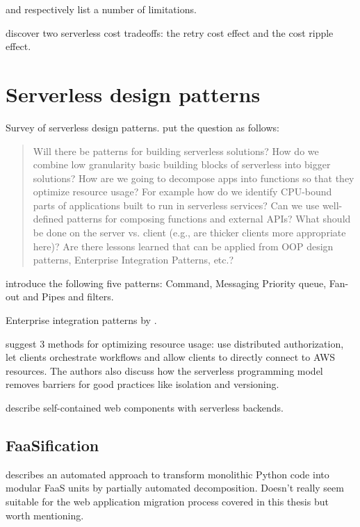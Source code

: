 \documentclass[utf8,english]{gradu3}
\begin{document}
\textcite{robert2016serverlessarchitectures} and \textcite{adzic2017serverless} respectively list a number of limitations.

\textcite{kuhlenkamp17costradamus} discover two serverless cost tradeoffs: the retry cost effect and the cost ripple effect.

\chapter{Serverless design patterns}

Survey of serverless design patterns. \textcite{baldini17currentTrends} put the question as follows:

\begin{quote}
Will there be patterns for building serverless solutions? How do we combine low granularity basic building blocks of serverless into bigger solutions? How are we going to decompose apps into functions so that they optimize resource usage? For example how do we identify CPU-bound parts of applications built to run in serverless services? Can we use well-defined patterns for composing functions and external APIs? What should be done on the server vs. client (e.g., are thicker clients more appropriate here)? Are there lessons learned that can be applied from OOP design patterns, Enterprise Integration Patterns, etc.?
\end{quote}

\textcite{sbarski2017serverless} introduce the following five patterns: Command, Messaging Priority queue, Fan-out and Pipes and filters.

Enterprise integration patterns by \textcite{hohpe2004enterprise}.

\textcite{adzic2017serverless} suggest 3 methods for optimizing resource usage: use distributed authorization, let clients orchestrate workflows and allow clients to directly connect to AWS resources. The authors also discuss how the serverless programming model removes barriers for good practices like isolation and versioning.

\textcite{ast17webcomponent} describe self-contained web components with serverless backends.

\section{FaaSification}

\textcite{spillner17transformpython} describes an automated approach to transform monolithic Python code into modular FaaS units by partially automated decomposition. Doesn't really seem suitable for the web application migration process covered in this thesis but worth mentioning.
\end{document}
